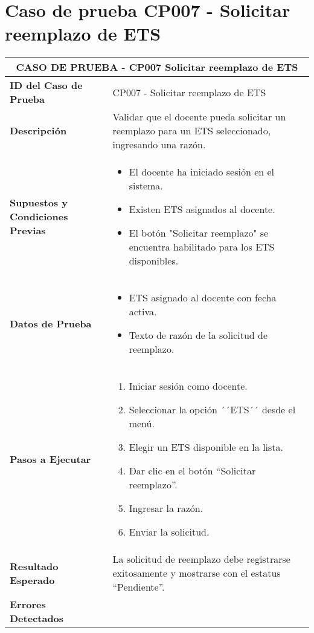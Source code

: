 \section{Caso de prueba CP007 - Solicitar reemplazo de ETS}

\begin{longtable}{|p{5cm}|p{10cm}|}
	\hline
	\multicolumn{2}{|c|}{\textbf{CASO DE PRUEBA - CP007 Solicitar reemplazo de ETS}} \\
	\hline
	\textbf{ID del Caso de Prueba} & CP007 - Solicitar reemplazo de ETS \\
	\hline
	\textbf{Descripción} & Validar que el docente pueda solicitar un reemplazo para un ETS seleccionado, ingresando una razón. \\
	\hline
	\textbf{Supuestos y Condiciones Previas} & 
	\begin{itemize}
		\item El docente ha iniciado sesión en el sistema.
		\item Existen ETS asignados al docente.
		\item El botón "Solicitar reemplazo" se encuentra habilitado para los ETS disponibles.
	\end{itemize} \\
	\hline
	\textbf{Datos de Prueba} & 
	\begin{itemize}
		\item ETS asignado al docente con fecha activa.
		\item Texto de razón de la solicitud de reemplazo.
	\end{itemize} \\
	\hline
	\textbf{Pasos a Ejecutar} & 
	\begin{enumerate}
		\item Iniciar sesión como docente.
		\item Seleccionar la opción ´´ETS´´ desde el menú.
		\item Elegir un ETS disponible en la lista.
		\item Dar clic en el botón “Solicitar reemplazo”.
		\item Ingresar la razón.
		\item Enviar la solicitud.
	\end{enumerate} \\
	\hline
	\textbf{Resultado Esperado} & 
	La solicitud de reemplazo debe registrarse exitosamente y mostrarse con el estatus “Pendiente”. \\
	\hline
	\textbf{Errores Detectados} & 
	\begin{itemize}

\end{itemize}
\end{longtable}
